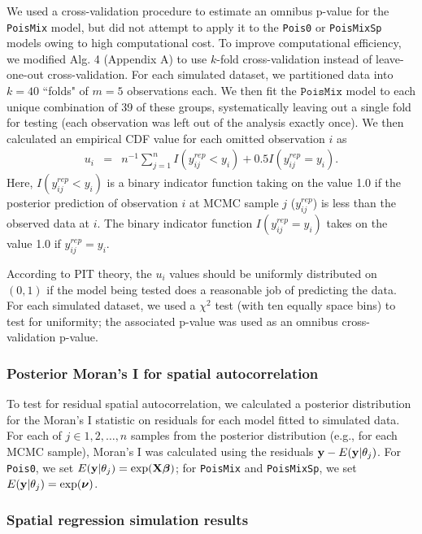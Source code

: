 \documentclass[12pt,english]{article}
\begin{document}
\begin{spacing}{1.9}
We used a cross-validation procedure to estimate an omnibus p-value
for the \texttt{PoisMix} model, but did not attempt to apply it to the
\texttt{Pois0} or \texttt{PoisMixSp} models owing to high
computational cost.  To improve computational efficiency, we modified
Alg. 4 (Appendix A) to use $k$-fold cross-validation instead of
leave-one-out cross-validation.  For each simulated dataset, we
partitioned data into $k=40$ ``folds" of $m=5$ observations each.  We
then fit the $\texttt{PoisMix}$ model to each unique combination of 39
of these groups, systematically leaving out a single fold for testing
(each observation was left out of the analysis exactly once).  We then
calculated an empirical CDF value for each omitted observation $i$ as
\begin{eqnarray*}
  u_i & = & n^{-1} \sum_{j=1}^n I(y_{ij}^{rep} < y_i) + 0.5 I(y_{ij}^{rep} = y_i).
\end{eqnarray*}
Here, $I(y_{ij}^{rep} < y_i)$ is a binary indicator function taking on
the value 1.0 if the posterior prediction of observation $i$ at MCMC
sample $j$ ($y_{ij}^{rep}$) is less than the observed data at $i$.
The binary indicator function $I(y_{ij}^{rep} = y_i)$ takes on the
value 1.0 if $y_{ij}^{rep} = y_i$.

According to PIT theory, the $u_i$ values should be uniformly
distributed on $(0,1)$ if the model being tested does a reasonable job
of predicting the data. For each simulated dataset, we used a $\chi^2$
test (with ten equally space bins) to test for uniformity; the
associated p-value was used as an omnibus cross-validation p-value.

\subsubsection{Posterior Moran's I for spatial autocorrelation}

To test for residual spatial autocorrelation, we calculated a
posterior distribution for the Moran's I statistic on residuals for
each model fitted to simulated data.  For each of $j \in 1,2,\hdots,n$
samples from the posterior distribution (e.g., for each MCMC sample),
Moran's I was calculated using the residuals
${\bf y} - E({\bf y}|\theta_j)$.  For \texttt{Pois0}, we set
$E({\bf y}|\theta_j) = \exp({\bf X} \boldsymbol{\beta})$; for \texttt{PoisMix} and
\texttt{PoisMixSp}, we set $E({\bf y}|\theta_j) = \exp(\boldsymbol{\nu})$.


\subsubsection{Spatial regression simulation results}


\end{spacing}
\end{document}
